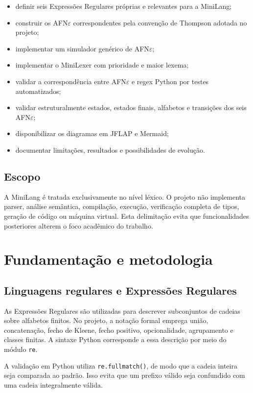 \documentclass[12pt,a4paper,oneside]{report}
\begin{document}
\begin{itemize}
    \item definir seis Expressões Regulares próprias e relevantes para a MiniLang;
    \item construir os AFN$\varepsilon$ correspondentes pela convenção de Thompson adotada no projeto;
    \item implementar um simulador genérico de AFN$\varepsilon$;
    \item implementar o MiniLexer com prioridade e maior lexema;
    \item validar a correspondência entre AFN$\varepsilon$ e regex Python por testes automatizados;
    \item validar estruturalmente estados, estados finais, alfabetos e transições dos seis AFN$\varepsilon$;
    \item disponibilizar os diagramas em JFLAP e Mermaid;
    \item documentar limitações, resultados e possibilidades de evolução.
\end{itemize}

\section{Escopo}

A MiniLang é tratada exclusivamente no nível léxico. O projeto não implementa parser, análise semântica, compilação, execução, verificação completa de tipos, geração de código ou máquina virtual. Esta delimitação evita que funcionalidades posteriores alterem o foco acadêmico do trabalho.



\chapter{Fundamentação e metodologia}

\section{Linguagens regulares e Expressões Regulares}

As Expressões Regulares são utilizadas para descrever subconjuntos de cadeias sobre alfabetos finitos. No projeto, a notação formal emprega união, concatenação, fecho de Kleene, fecho positivo, opcionalidade, agrupamento e classes finitas. A sintaxe Python corresponde a essa descrição por meio do módulo \texttt{re}.

A validação em Python utiliza \texttt{re.fullmatch()}, de modo que a cadeia inteira seja comparada ao padrão. Isso evita que um prefixo válido seja confundido com uma cadeia integralmente válida.
\end{document}
